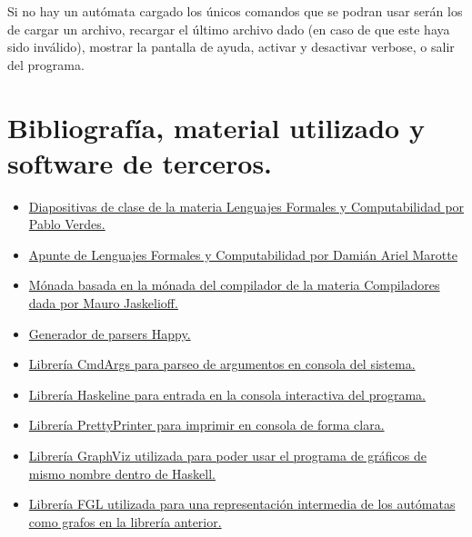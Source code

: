 \documentclass[12pt,a4paper]{article}
\begin{document}
Si no hay un autómata cargado los únicos comandos que se podran usar serán los de
cargar un archivo, recargar el último archivo dado (en caso de que este haya sido inválido),
mostrar la pantalla de ayuda, activar y desactivar verbose, o salir del programa.

\newpage

\section{Bibliografía, material utilizado y software de terceros.}
\begin{itemize}
  \item \href{https://dcc.fceia.unr.edu.ar/es/lcc/r213}
             {Diapositivas de clase de la materia Lenguajes Formales y Computabilidad por Pablo Verdes.}
  \item \href{https://github.com/damianarielm/lcc/blob/master/2%20Ano/Lenguajes%20Formales%20y%20Computabilidad/Lenguajes%20Formales.pdf}
             {Apunte de Lenguajes Formales y Computabilidad por Damián Ariel Marotte}
  \item \href{https://github.com/compiladores-lcc/compiladores2021/blob/main/src/MonadFD4.hs}
             {Mónada basada en la mónada del compilador de la materia Compiladores dada por Mauro Jaskelioff.}
  \item \href{https://www.haskell.org/happy/}
             {Generador de parsers Happy.}
  \item \href{https://hackage.haskell.org/package/cmdargs}
             {Librería CmdArgs para parseo de argumentos en consola del sistema.}
  \item \href{https://hackage.haskell.org/package/haskeline}
             {Librería Haskeline para entrada en la consola interactiva del programa.}
  \item \href{https://hackage.haskell.org/package/prettyprinter}
             {Librería PrettyPrinter para imprimir en consola de forma clara.}
  \item \href{https://hackage.haskell.org/package/graphviz}
             {Librería GraphViz utilizada para poder usar el programa de gráficos de mismo nombre dentro de Haskell.}
  \item \href{https://hackage.haskell.org/package/fgl-5.7.0.3}
             {Librería FGL utilizada para una representación intermedia de los autómatas como grafos en la librería anterior.}
\end{itemize}
\end{document}
